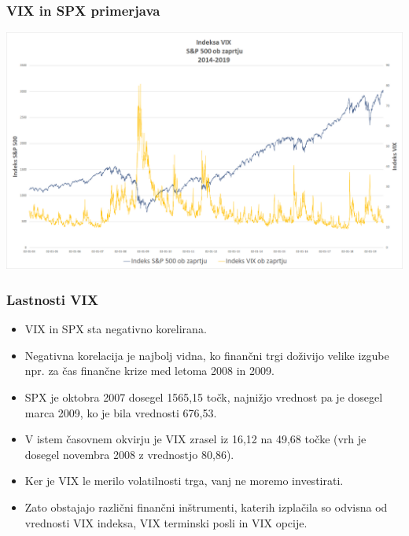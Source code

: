 \documentclass[10pt]{beamer}
\begin{document}
\begin{frame}
\frametitle{VIX in SPX primerjava}
\includegraphics[width=1\textwidth]{./Grafi/VIX vs SPX 2004-2019.png}
\end{frame}

\begin{frame}
\frametitle{Lastnosti VIX}
\begin{itemize}
\item VIX in SPX sta negativno korelirana.
\item Negativna korelacija je najbolj vidna, ko finančni trgi doživijo velike izgube npr. za čas finančne krize med letoma 2008 in 2009. 
\item SPX je oktobra 2007 dosegel 1565,15 točk, najnižjo vrednost pa je dosegel marca 2009, ko je bila vrednosti 676,53. 
\item V istem časovnem okvirju je VIX zrasel iz 16,12 na 49,68 točke (vrh je dosegel novembra 2008 z vrednostjo 80,86). 
\item Ker je VIX le merilo volatilnosti trga, vanj ne moremo investirati.
\item Zato obstajajo različni finančni inštrumenti, katerih izplačila so odvisna od vrednosti VIX indeksa, VIX terminski posli in VIX opcije.
\end{itemize}
\end{frame}
\end{document}
